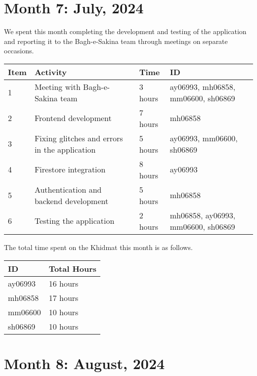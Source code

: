 \documentclass{article}
\begin{document}
\newpage
\section*{Month 7: July, 2024}

We spent this month completing the development and testing of the application and reporting it to the Bagh-e-Sakina team through meetings on separate occasions. 

\vspace{1em}

\noindent \begin{tabular}{|l|l|l|l|}
  \hline
  Item & Activity & Time & ID \\ \hline
  1 & Meeting with Bagh-e-Sakina team & 3 hours & ay06993, mh06858, mm06600, sh06869 \\ \hline
  2 & Frontend development & 7 hours  & mh06858 \\ \hline
  3 & Fixing glitches and errors in the application & 5 hours  & ay06993, mm06600, sh06869 \\ \hline
  4 & Firestore integration & 8 hours & ay06993 \\ \hline
  5 & Authentication and backend development & 5 hours & mh06858 \\ \hline
  6 & Testing the application & 2 hours & mh06858, ay06993, mm06600, sh06869 \\ \hline

\end{tabular}

\vspace{1em}

\noindent The total time spent on the Khidmat this month is as follows.

\vspace{1em}

\noindent \begin{tabular}{|l|l|}
  \hline
  ID & Total Hours \\\hline
  ay06993 & 16 hours \\ \hline
  mh06858 & 17 hours  \\ \hline
  mm06600 & 10 hours \\ \hline
  sh06869 & 10 hours \\ \hline
\end{tabular}

\newpage

\section*{Month 8: August, 2024}
\end{document}
